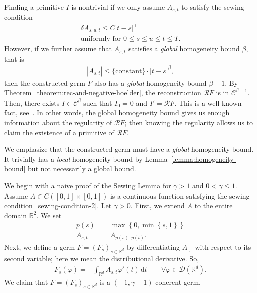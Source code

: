 Finding a primitive \( I \) is nontrivial if we only assume \( A_{s,t} \) to satisfy the sewing condition
\begin{gather}\label{sewing-condition-2}
  \delta A_{s,u,t} \leq C {|t-s|}^\gamma \\
  \text{uniformly for \(0 \leq s \leq u \leq t \leq T\)}. \nonumber
\end{gather}
However, if we further assume that \( A_{s,t} \) satisfies a \emph{global} homogeneity bound \( \beta \), that is
\begin{align*}
  |A_{s,t}| \leq \{ \mathrm{constant} \} \cdot |t-s|^\beta,
\end{align*}
then the constructed germ \( F \) also has a \emph{global} homogeneity bound \( \beta - 1 \). By Theorem~\ref{theorem:rec-and-negative-hoelder}, the reconstruction \( \mathcal{R}F \) is in \( \mathcal{C}^{\beta - 1} \). Then, there exists \( I \in \mathcal{C}^\beta \) such that \( I_0 = 0 \) and \( I' = \mathcal{R}F \). This is a well-known fact, see~\cite[Lemma~3.10]{brault2019solving}. In other words, the global homogeneity bound gives us enough information about the regularity of \( \mathcal{R}F \); then knowing the regularity allows us to claim the existence of a primitive of \( \mathcal{R}F \). 

We emphasize that the constructed germ must have a \emph{global} homogeneity bound. It trivially has a \emph{local} homogeneity bound by Lemma~\ref{lemma:homogeneity-bound} but not necessarily a global bound.

We begin with a naive proof of the Sewing Lemma for \( \gamma > 1 \) and \( 0 < \gamma \leq 1 \). Assume \( A \in C([0,1] \times [0,1]) \) is a continuous function satisfying the sewing condition~\eqref{sewing-condition-2}. Let \( \gamma > 0 \). First, we extend \( A \) to the entire domain \( \mathbb{R}^2 \). We set \
\begin{align*}
  p(s) &= \max\left\{ 0, \min\left\{ s, 1 \right\} \right\}  \\ A_{s,t} &= A_{p(s), p(t)}.
\end{align*}
Next, we define a germ \( F = (F_s)_{s \in \mathbb{R}^d} \) by differentiating \( A_{\cdot, \cdot} \) with respect to its second variable; here we mean the distributional derivative. So, 
\begin{align*}
  F_s(\varphi) = - \int_{\mathbb{R}^d} A_{s,t} \varphi'(t) \, \mathrm{d}t \qquad \forall \varphi \in \mathcal{D}(\mathbb{R}^d).
\end{align*}
We claim that \( F = (F_s)_{s \in \mathbb{R}^d} \) is a \( (-1, \gamma - 1) \)-coherent germ.

